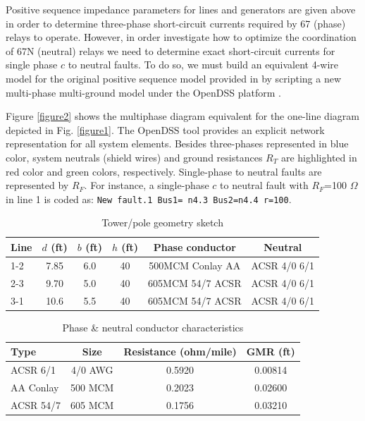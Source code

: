 \documentclass[letterpaper, 10 pt, conference]{IEEEtran}
\begin{document}
Positive sequence impedance parameters for lines and generators are given above in order to determine three-phase short-circuit currents required by  67 (phase) relays to operate. However, in order investigate how to optimize the coordination of  67N (neutral) relays we need to determine exact short-circuit currents for single phase $c$ to neutral faults. To do so, we must build an equivalent 4-wire model for the original positive sequence model provided in \cite{urdaneta1988}  by scripting a new multi-phase multi-ground model under the OpenDSS platform \cite{opendss}.

Figure \ref{figure2} shows the multiphase diagram equivalent for the one-line diagram depicted in Fig. \ref{figure1}. The OpenDSS tool provides an explicit network representation for all system elements.
Besides  three-phases represented in blue color, system neutrals (shield wires) and ground resistances $R_T$ are highlighted in red color and green colors, respectively. Single-phase to neutral faults are represented by $R_F$. For instance, a single-phase $c$ to neutral fault with $R_F$=100 $\Omega$ in line 1 is coded as: \scriptsize
 \texttt{New fault.1   Bus1= n4.3   Bus2=n4.4 r=100}. \normalsize


\begin{table}[t]
\begin{center}\caption{Tower/pole geometry sketch}\label{Table2}
\centering
\begin{tabular}{lccccc}\hline
Line & $d$ (ft)  & $b$ (ft) & $h$ (ft) & Phase conductor & Neutral  \\\hline
1-2  & 7.85 & 6.0      &  40 & 500MCM Conlay AA & ACSR 4/0 6/1\\
2-3  & 9.70 & 5.0      &  40 & 605MCM 54/7 ACSR & ACSR 4/0 6/1\\
3-1  & 10.6 & 5.5      &  40 & 605MCM 54/7 ACSR & ACSR 4/0 6/1\\\hline
\end{tabular}
\end{center}
\end{table}

\begin{table}[t]
\begin{center}\caption{Phase \& neutral conductor characteristics}\label{Table3}
\centering
\begin{tabular}{lccc}\hline
Type & Size & Resistance (ohm/mile)  & GMR (ft)  \\\hline
ACSR 6/1 & 4/0 AWG  & 0.5920 & 0.00814 \\
AA Conlay & 500 MCM & 0.2023 & 0.02600 \\
ACSR 54/7 &605 MCM&0.1756 &0.03210\\\hline
\end{tabular}
\end{center}
\end{table}
\end{document}
